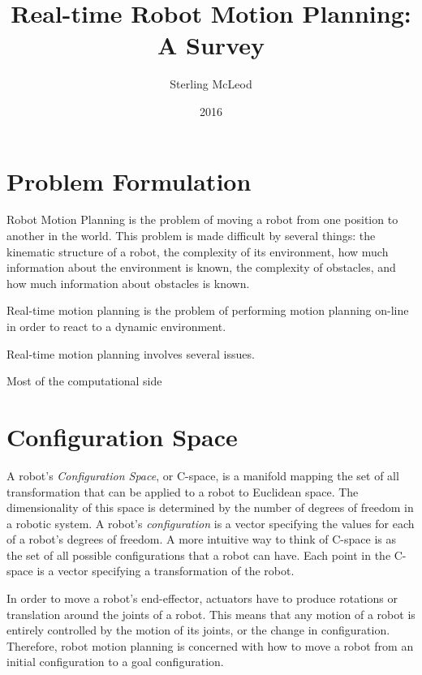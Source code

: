 \documentclass[10pt,conference]{ieeeconf}
\begin{document}


\nocite{PRM}
\nocite{RRT}

\nocite{EPN_Adaptive}
\nocite{RAMP}


\author{Sterling McLeod}
\title {Real-time Robot Motion Planning: A Survey}
\date {2016}

\maketitle

\renewcommand{\algorithmicforall}{\textbf{for each}}

\section{Problem Formulation}

	Robot Motion Planning is the problem of moving a robot from one position to another in the world. This problem is made difficult by several things: the kinematic structure of a robot, the complexity of its environment, how much information about the environment is known, the complexity of obstacles, and how much information about obstacles is known. 
	
	Real-time motion planning is the problem of performing motion planning on-line in order to react to a dynamic environment.
	
	Real-time motion planning involves several issues. 
	
	Most of the computational side

	
\section{Configuration Space}

A robot's \emph{Configuration Space}, or C-space, is a manifold mapping the set of all transformation that can be applied to a robot to Euclidean space. The dimensionality of this space is determined by the number of degrees of freedom in a robotic system. A robot's \emph{configuration} is a vector specifying the values for each of a robot's degrees of freedom. A more intuitive way to think of C-space is as the set of all possible configurations that a robot can have. Each point in the C-space is a vector specifying a transformation of the robot.

In order to move a robot's end-effector, actuators have to produce rotations or translation around the joints of a robot. This means that any motion of a robot is entirely controlled by the motion of its joints, or the change in configuration. Therefore, robot motion planning is concerned with how to move a robot from an initial configuration to a goal configuration.
\end{document}
